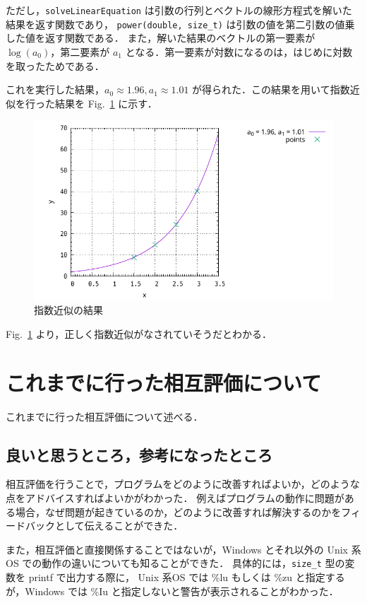 \documentclass[gutter=20mm,fore-edge=20mm,head_space=30mm,foot_space=30mm]{jlreq}
\begin{document}
ただし，\verb|solveLinearEquation| は引数の行列とベクトルの線形方程式を解いた結果を返す関数であり，
\verb|power(double, size_t)| は引数の値を第二引数の値乗した値を返す関数である．
また，解いた結果のベクトルの第一要素が $\log(a_0)$，第二要素が $a_1$ となる．第一要素が対数になるのは，はじめに対数を取ったためである．

これを実行した結果，$a_0 \approx 1.96, a_1 \approx 1.01$ が得られた．この結果を用いて指数近似を行った結果を Fig.~\ref{fig:expapprox} に示す．

\begin{figure}[H]
  \centering
  \includegraphics[width=0.8\linewidth]{1/expapprox.pdf}
  \caption{指数近似の結果}
  \label{fig:expapprox}
\end{figure}

Fig.~\ref{fig:expapprox} より，正しく指数近似がなされていそうだとわかる．

\section{これまでに行った相互評価について}
これまでに行った相互評価について述べる．
\subsection{良いと思うところ，参考になったところ}
相互評価を行うことで，プログラムをどのように改善すればよいか，どのような点をアドバイスすればよいかがわかった．
例えばプログラムの動作に問題がある場合，なぜ問題が起きているのか，どのように改善すれば解決するのかをフィードバックとして伝えることができた．

また，相互評価と直接関係することではないが，Windows とそれ以外の Unix 系OS での動作の違いについても知ることができた．
具体的には，\verb|size_t| 型の変数を printf で出力する際に，
Unix 系OS では \%lu もしくは \%zu と指定するが，Windows では \%Iu と指定しないと警告が表示されることがわかった．
\end{document}
